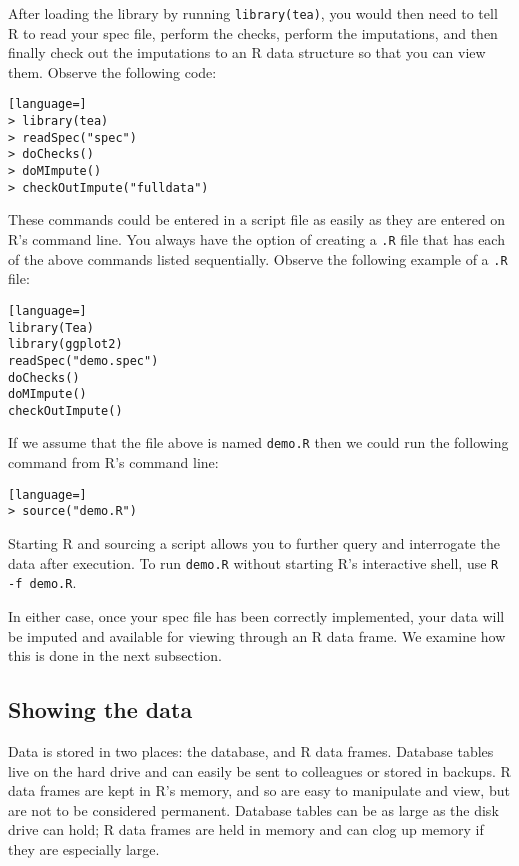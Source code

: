 \documentclass{article}
\begin{document}
After loading the library by running {\tt library(tea)}, you would then need to 
tell R to read your spec file, perform the checks, perform the imputations, 
and then finally check out the imputations to an R data structure so that you 
can view them. Observe the following code:

\begin{lstlisting}[language=]
> library(tea)
> readSpec("spec")
> doChecks()
> doMImpute()
> checkOutImpute("fulldata")
\end{lstlisting}

These commands could be entered in a script file as easily as they are entered on R's command line.
You always have the option of creating a {\tt .R} file that has each of the above commands listed 
sequentially. Observe the following example of a {\tt .R} file:

\begin{lstlisting}[language=]
library(Tea)
library(ggplot2)
readSpec("demo.spec")
doChecks()
doMImpute()
checkOutImpute()
\end{lstlisting}

If we assume that the file above is named {\tt demo.R} then we could run the following command 
from R's command line:

\begin{lstlisting}[language=]
> source("demo.R")
\end{lstlisting}

Starting R and sourcing a script allows you to further query and interrogate the data
after execution. To run {\tt demo.R} without starting R's interactive shell, use {\tt R -f
demo.R}.

In either case, once your spec file has been correctly implemented, your data will
be imputed and available for viewing through an R data frame.  We examine how this is
done in the next subsection.

\subsection{Showing the data}
Data is stored in two places: the database, and R data frames. Database tables
live on the hard drive and can easily be sent to colleagues or stored in
backups. R data frames are kept in R's memory, and so are easy to manipulate and
view, but are not to be considered permanent. Database tables can be as large as
the disk drive can hold; R data frames are held in memory and can clog up memory if
they are especially large.
\end{document}
